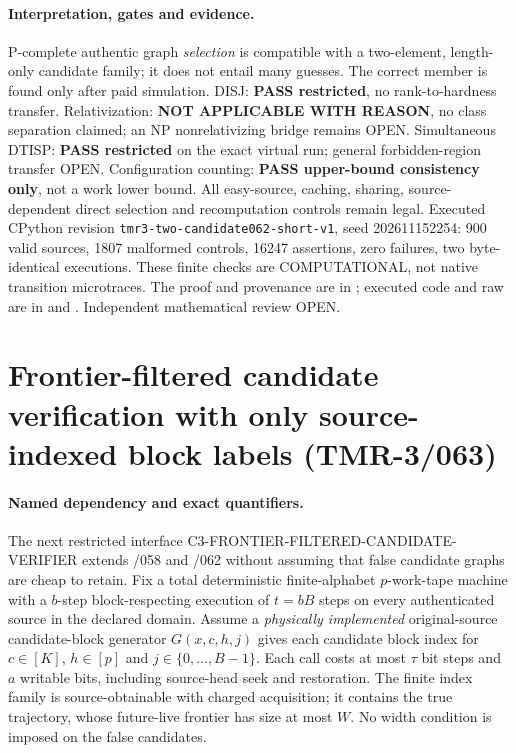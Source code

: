 \documentclass[11pt]{article}
\begin{document}
\paragraph{Interpretation, gates and evidence.}
P-complete authentic graph \emph{selection} is compatible with a
two-element, length-only candidate family; it does not entail many
guesses. The correct member is found only after paid simulation.
DISJ: \textbf{PASS restricted}, no rank-to-hardness transfer.
Relativization: \textbf{NOT APPLICABLE WITH REASON}, no class
separation claimed; an NP nonrelativizing bridge remains OPEN.
Simultaneous DTISP: \textbf{PASS restricted} on the exact virtual
run; general forbidden-region transfer OPEN. Configuration
counting: \textbf{PASS upper-bound consistency only}, not a work
lower bound. All easy-source, caching, sharing, source-dependent
direct selection and recomputation controls remain legal.
Executed CPython revision \texttt{tmr3-two-candidate062-short-v1},
seed 202611152254: 900 valid sources, 1807 malformed controls,
16247 assertions, zero failures, two byte-identical executions.
These finite checks are COMPUTATIONAL, not native transition
microtraces. The proof and provenance are in
;
executed code and raw are in  and
. Independent mathematical review OPEN.

\section{Frontier-filtered candidate verification with only source-indexed block labels (TMR-3/063)}
\paragraph{Named dependency and exact quantifiers.}
The next restricted interface \textsf{C3-FRONTIER-FILTERED-CANDIDATE-VERIFIER}
extends /058 and /062 without assuming that false candidate graphs
are cheap to retain. Fix a total deterministic finite-alphabet
$p$-work-tape machine with a $b$-step block-respecting execution
of $t=bB$ steps on every authenticated source in the declared domain.
Assume a \emph{physically implemented} original-source candidate-block
generator $G(x,c,h,j)$ gives each candidate block index for
$c\in[K]$, $h\in[p]$ and $j\in\{0,\ldots,B-1\}$.
Each call costs at most $\tau$ bit steps and $a$ writable bits,
including source-head seek and restoration.
The finite index family is source-obtainable with charged acquisition;
it contains the true trajectory, whose future-live frontier has size
at most $W$. No width condition is imposed on the false candidates.
\end{document}
